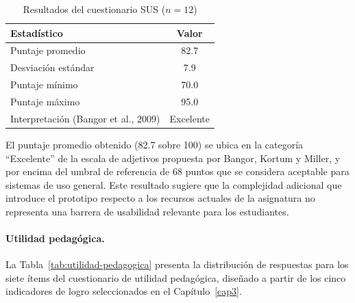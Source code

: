 \begin{table}[H]
\centering
\footnotesize
\caption{Resultados del cuestionario SUS ($n = 12$)}
\label{tab:sus-resultados}
\begin{tabular}{|l|c|}
\hline
\textbf{Estadístico} & \textbf{Valor} \\
\hline
Puntaje promedio & 82.7 \\
\hline
Desviación estándar & 7.9 \\
\hline
Puntaje mínimo & 70.0 \\
\hline
Puntaje máximo & 95.0 \\
\hline
Interpretación (Bangor et al., 2009) & Excelente \\
\hline
\end{tabular}
\end{table}

El puntaje promedio obtenido (82.7 sobre 100) se ubica en la categoría ``Excelente'' de la escala de adjetivos propuesta por Bangor, Kortum y Miller, y por encima del umbral de referencia de 68 puntos que se considera aceptable para sistemas de uso general. Este resultado sugiere que la complejidad adicional que introduce el prototipo respecto a los recursos actuales de la asignatura no representa una barrera de usabilidad relevante para los estudiantes.

\paragraph{Utilidad pedagógica.} La Tabla~\ref{tab:utilidad-pedagogica} presenta la distribución de respuestas para los siete ítems del cuestionario de utilidad pedagógica, diseñado a partir de los cinco indicadores de logro seleccionados en el Capítulo~\ref{cap3}.

